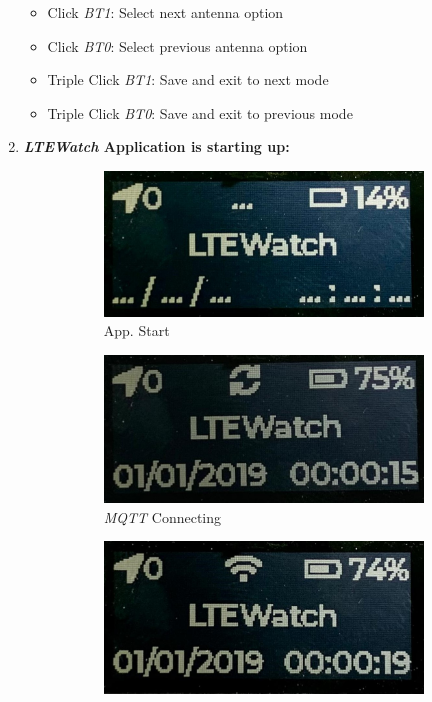 \documentclass[Report.tex]{subfiles}
\begin{document}
\begin{enumerate}
\begin{itemize}
\item Click \textit{BT1}: Select next antenna option
\item Click \textit{BT0}: Select previous antenna option
\item Triple Click \textit{BT1}: Save and exit to next mode
\item Triple Click \textit{BT0}: Save and exit to previous mode
\end{itemize}
\pagebreak
\item \textbf{\textit{LTEWatch} Application is starting up:}
\begin{figure}[H]
	\centering
\begin{subfigure}{.3\textwidth}
\centering
\includegraphics[width=1\textwidth]{Include/Figure/modification/display_6}
\caption{App. Start}
\end{subfigure}	
\begin{subfigure}{.3\textwidth}
\centering
\includegraphics[width=1\textwidth]{Include/Figure/modification/display_7}
\caption{\textit{MQTT} Connecting}
\end{subfigure}	
\begin{subfigure}{.3\textwidth}
\centering
\includegraphics[width=1\textwidth]{Include/Figure/modification/display_8}

\end{subfigure}
\end{figure}
\end{enumerate}
\end{document}

